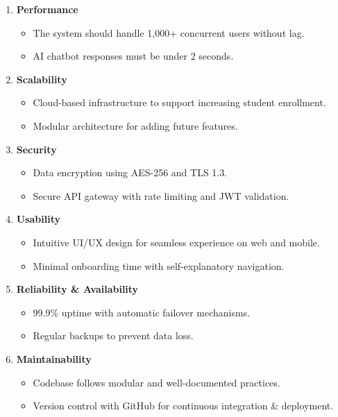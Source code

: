 \begin{enumerate}
    \item \textbf{Performance}
    \begin{itemize}
        \item The system should handle 1,000+ concurrent users without lag.
        \item AI chatbot responses must be under 2 seconds.
    \end{itemize}

    \item \textbf{Scalability}
    \begin{itemize}
        \item Cloud-based infrastructure to support increasing student enrollment.
        \item Modular architecture for adding future features.
    \end{itemize}

    \item \textbf{Security}
    \begin{itemize}
        \item Data encryption using AES-256 and TLS 1.3.
        \item Secure API gateway with rate limiting and JWT validation.
    \end{itemize}

    \item \textbf{Usability}
    \begin{itemize}
        \item Intuitive UI/UX design for seamless experience on web and mobile.
        \item Minimal onboarding time with self-explanatory navigation.
    \end{itemize}

    \item \textbf{Reliability \& Availability}
    \begin{itemize}
        \item 99.9\% uptime with automatic failover mechanisms.
        \item Regular backups to prevent data loss.
    \end{itemize}

    \item \textbf{Maintainability}
    \begin{itemize}
        \item Codebase follows modular and well-documented practices.
        \item Version control with GitHub for continuous integration \& deployment.
    \end{itemize}
\end{enumerate}

